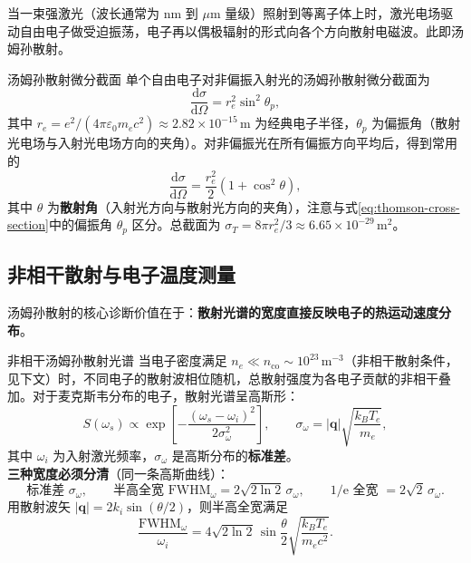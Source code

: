 \documentclass[12pt,a4paper,openany,oneside]{book}
\newcommand{\diff}{\mathrm{d}}
\newcommand{\ee}{\mathrm{e}}
\newcommand{\eps}{\varepsilon}
\newcommand{\vect}[1]{\bm{#1}}
\begin{document}
当一束强激光（波长通常为 $\mathrm{nm}$ 到 $\mu\mathrm{m}$ 量级）照射到等离子体上时，激光电场驱动自由电子做受迫振荡，电子再以偶极辐射的形式向各个方向散射电磁波。此即汤姆孙散射。

\begin{definition}{汤姆孙散射微分截面}{}{}
单个自由电子对非偏振入射光的汤姆孙散射微分截面为
\begin{equation}
\frac{\diff\sigma}{\diff\Omega} = r_e^2 \sin^2\theta_p,
\label{eq:thomson-cross-section}
\end{equation}
其中 $r_e = e^2/(4\pi\eps_0 m_e c^2) \approx 2.82\times 10^{-15}\,\mathrm{m}$ 为经典电子半径，$\theta_p$ 为偏振角（散射光电场与入射光电场方向的夹角）。对非偏振光在所有偏振方向平均后，得到常用的
\begin{equation}
\frac{\diff\sigma}{\diff\Omega} = \frac{r_e^2}{2}(1 + \cos^2\theta),
\label{eq:thomson-unpolarized}
\end{equation}
其中 $\theta$ 为\textbf{散射角}（入射光方向与散射光方向的夹角），注意与式\eqref{eq:thomson-cross-section}中的偏振角 $\theta_p$ 区分。总截面为 $\sigma_T = 8\pi r_e^2/3 \approx 6.65\times 10^{-29}\,\mathrm{m}^2$。
\end{definition}

\subsection{非相干散射与电子温度测量}

汤姆孙散射的核心诊断价值在于：\textbf{散射光谱的宽度直接反映电子的热运动速度分布}。

\begin{theorem}{非相干汤姆孙散射光谱}{}{}
当电子密度满足 $n_e \ll n_{\mathrm{co}} \sim 10^{23}\,\mathrm{m}^{-3}$（非相干散射条件，见下文）时，不同电子的散射波相位随机，总散射强度为各电子贡献的非相干叠加。对于麦克斯韦分布的电子，散射光谱呈高斯形：
\begin{equation}
S(\omega_s) \propto \exp\!\left[-\frac{(\omega_s - \omega_i)^2}{2\sigma_\omega^2}\right],
\qquad
\sigma_\omega = |\vect{q}|\sqrt{\frac{k_BT_e}{m_e}},
\label{eq:thomson-gaussian}
\end{equation}
其中 $\omega_i$ 为入射激光频率，$\sigma_\omega$ 是高斯分布的\textbf{标准差}。\\
\textbf{三种宽度必须分清}（同一条高斯曲线）：
\[
\text{标准差 } \sigma_\omega,\qquad
\text{半高全宽 } \mathrm{FWHM}_\omega = 2\sqrt{2\ln2}\,\sigma_\omega,\qquad
\text{$1/\ee$ 全宽 } = 2\sqrt2\,\sigma_\omega .
\]
用散射波矢 $|\vect{q}| = 2k_i\sin(\theta/2)$，则半高全宽满足
\begin{equation}
\frac{\mathrm{FWHM}_\omega}{\omega_i} = 4\sqrt{2\ln 2}\,\sin\frac{\theta}{2}
\sqrt{\frac{k_BT_e}{m_e c^2}}.
\label{eq:thomson-width}
\end{equation}
\end{theorem}
\end{document}
